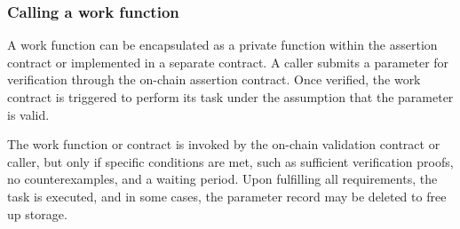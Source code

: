 \documentclass[runningheads]{llncs}
\begin{document}



\subsubsection{Calling a work function}
A work function can be encapsulated as a private function within the assertion contract or implemented in a separate contract. A caller submits a parameter for verification through the on-chain assertion contract. Once verified, the work contract is triggered to perform its task under the assumption that the parameter is valid.

The work function or contract is invoked by the on-chain validation contract or caller, but only if specific conditions are met, such as sufficient verification proofs, no counterexamples, and a waiting period. Upon fulfilling all requirements, the task is executed, and in some cases, the parameter record may be deleted to free up storage.
\end{document}

